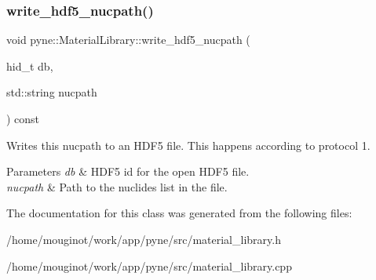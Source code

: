 \subsubsection{\texorpdfstring{write\+\_\+hdf5\+\_\+nucpath()}{write\_hdf5\_nucpath()}}
{\footnotesize\ttfamily void pyne\+::\+Material\+Library\+::write\+\_\+hdf5\+\_\+nucpath (\begin{DoxyParamCaption}\item[{hid\+\_\+t}]{db,  }\item[{std\+::string}]{nucpath }\end{DoxyParamCaption}) const}



Writes this nucpath to an H\+D\+F5 file. This happens according to protocol 1. 


\begin{DoxyParams}{Parameters}
{\em db} & H\+D\+F5 id for the open H\+D\+F5 file. \\
\hline
{\em nucpath} & Path to the nuclides list in the file. \\
\hline
\end{DoxyParams}


The documentation for this class was generated from the following files\+:\begin{DoxyCompactItemize}
\item 
/home/mouginot/work/app/pyne/src/material\+\_\+library.\+h\item 
/home/mouginot/work/app/pyne/src/material\+\_\+library.\+cpp\end{DoxyCompactItemize}
